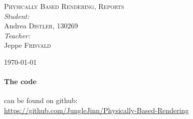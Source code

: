 \documentclass[a4paper]{article}
\begin{document}
\begin{titlepage}
\textsc{\LARGE Physically Based Rendering, Reports}\\[1.5cm]

\emph{Student:}\\
Andrea \textsc{Distler}, 130269\\[1.5cm]

\emph{Teacher:}\\
Jeppe \textsc{Frisvald}\\

\vfill

{\large \today}
\end{titlepage}

\tableofcontents


\paragraph{The code} can be found on github: \\ \url{https://github.com/JungleJinn/Physically-Based-Rendering}

\newpage


\newpage


\newpage


\newpage


\newpage

\end{document}
